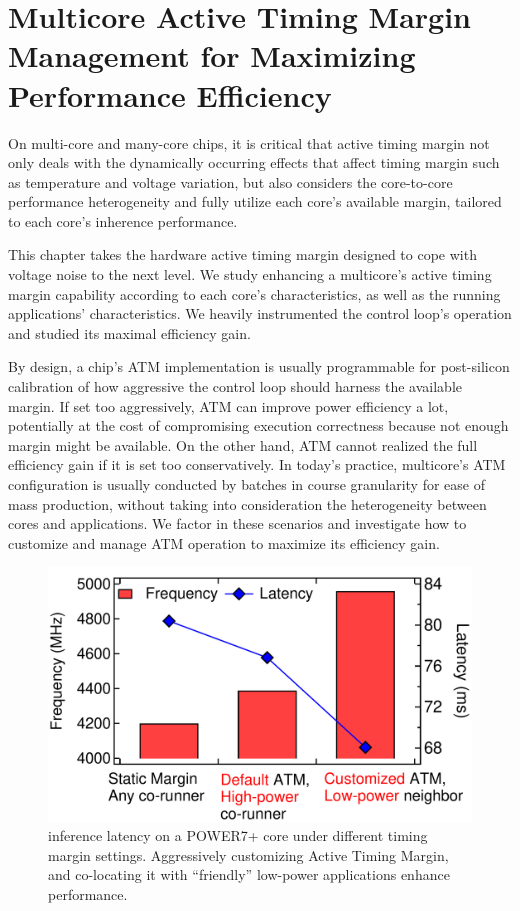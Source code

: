 
\chapter{Multicore Active Timing Margin Management for Maximizing Performance Efficiency}
\label{sec:process}

On multi-core and many-core chips, it is critical that active timing margin not only deals with the dynamically occurring effects that affect timing margin such as temperature and voltage variation, but also considers the core-to-core performance heterogeneity and fully utilize each core's available margin, tailored to each core's inherence performance.

This chapter takes the hardware active timing margin designed to cope with voltage noise to the next level. We study enhancing a multicore's active timing margin capability according to each core's characteristics, as well as the running applications' characteristics. We heavily instrumented the control loop's operation and studied its maximal efficiency gain.

By design, a chip's ATM implementation is usually programmable for post-silicon calibration of how aggressive the control loop should harness the available margin. If set too aggressively, ATM can improve power efficiency a lot, potentially at the cost of compromising execution correctness because not enough margin might be available. On the other hand, ATM cannot realized the full efficiency gain if it is set too conservatively. In today's practice, multicore's ATM configuration is usually conducted by batches in course granularity for ease of mass production, without taking into consideration the heterogeneity between cores and applications. We factor in these scenarios and investigate how to customize and manage ATM operation to maximize its efficiency gain.

\begin{figure}[t]
  \centering
  \includegraphics[trim=0 0 0 0,clip,width=.825\linewidth]{graphs/process//noisy-latency.pdf}
  \caption{ inference latency on a POWER7+ core under different timing margin settings. Aggressively customizing Active Timing Margin, and co-locating it with ``friendly'' low-power applications enhance performance.}

  \label{fig:motivate-latency}
  \vspace{-0.5cm}
\end{figure}

